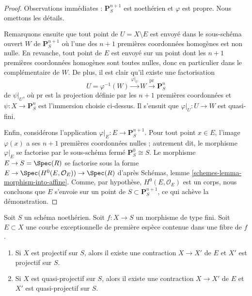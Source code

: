 \begin{proof}
\medskip\noindent Observations immédiates : $\mathbf{P}^{n + 1}_S$ est noethérien et $\varphi$ est propre. Nous omettons les détails.

\medskip\noindent Remarquons ensuite que tout point de $U = X \setminus E$ est envoyé dans le sous-schéma ouvert $W$ de $\mathbf{P}^{n + 1}_S$ où l'une des $n + 1$ premières coordonnées homogènes est non nulle. En revanche, tout point de $E$ est envoyé sur un point dont les $n + 1$ premières coordonnées homogènes sont toutes nulles, donc en particulier dans le complémentaire de $W$. De plus, il est clair qu'il existe une factorisation $$
U = \varphi^{-1}(W) \xrightarrow{\varphi|_U}
W \xrightarrow{\text{pr}} \mathbf{P}^n_S
$$ de $\psi|_U$, où $\text{pr}$ est la projection définie par les $n + 1$ premières coordonnées et $\psi : X \to \mathbf{P}^n_S$ est l'immersion choisie ci-dessus. Il s'ensuit que $\varphi|_U : U \to W$ est quasi-fini.

\medskip\noindent Enfin, considérons l'application $\varphi|_E : E \to \mathbf{P}^{n + 1}_S$. Pour tout point $x \in E$, l'image $\varphi(x)$ a ses $n + 1$ premières coordonnées nulles ; autrement dit, le morphisme $\varphi|_E$ se factorise par le sous-schéma fermé $\mathbf{P}^0_S \cong S$. Le morphisme $E \to S = \Spec(R)$ se factorise sous la forme $E \to \Spec(H^0(E, \mathcal{O}_E)) \to \Spec(R)$ d'après Schémas, lemme \ref{schemes-lemma-morphism-into-affine}. Comme, par hypothèse, $H^0(E, \mathcal{O}_E)$ est un corps, nous concluons que $E$ s'envoie sur un point de $S \subset \mathbf{P}^{n + 1}_S$, ce qui achève la démonstration. \end{proof}

\begin{lemma} \label{lemma-contract-when-quasi-projective} Soit $S$ un schéma noethérien. Soit $f : X \to S$ un morphisme de type fini. Soit $E \subset X$ une courbe exceptionnelle de première espèce contenue dans une fibre de $f$. \begin{enumerate} \item Si $X$ est projectif sur $S$, alors il existe une contraction $X \to X'$ de $E$ et $X'$ est projectif sur $S$. \item Si $X$ est quasi-projectif sur $S$, alors il existe une contraction $X \to X'$ de $E$ et $X'$ est quasi-projectif sur $S$. \end{enumerate} \end{lemma}

